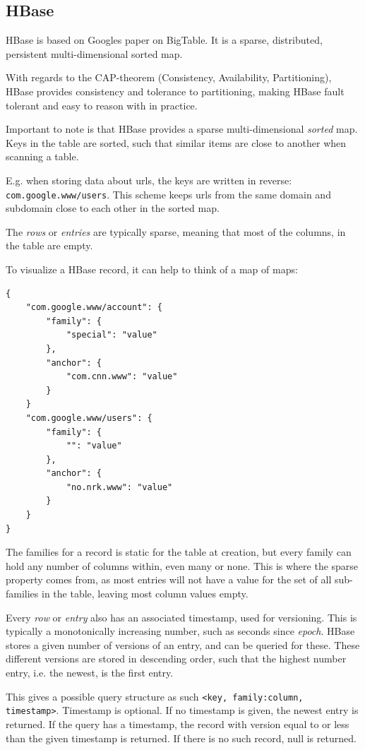 \subsection{HBase}
HBase is based on Googles paper on BigTable.
It is a sparse, distributed, persistent multi-dimensional sorted map.

With regards to the CAP-theorem (Consistency, Availability, Partitioning), HBase provides consistency and tolerance to partitioning, making HBase fault tolerant and easy to reason with in practice.

Important to note is that HBase provides a sparse multi-dimensional \emph{sorted} map.
Keys in the table are sorted, such that similar items are close to another when scanning a table.

E.g. when storing data about urls, the keys are written in reverse: \texttt{com.google.www/users}. This scheme keeps urls from the same domain and subdomain close to each other in the sorted map.

The \emph{rows} or \emph{entries} are typically sparse, meaning that most of the columns, in the table are empty.

To visualize a HBase record, it can help to think of a map of maps:

\begin{lstlisting}[style=customc, caption=A JSON approach to visualize how rows in HBase are structured. Idea courtesy of Jim R. Wilson\cite{jimbojw}.]
{
	"com.google.www/account": {
		"family": {
			"special": "value"
		},
		"anchor": {
			"com.cnn.www": "value"
		}
	}
	"com.google.www/users": {
		"family": {
			"": "value"
		},
		"anchor": {
			"no.nrk.www": "value"
		}
	}
}
\end{lstlisting}

The families for a record is static for the table at creation, but every family can hold any number of columns within, even many or none.
This is where the sparse property comes from, as most entries will not have a value for the set of all sub-families in the table, leaving most column values empty.

Every \emph{row} or \emph{entry} also has an associated timestamp, used for versioning. This is typically a monotonically increasing number, such as seconds since \emph{epoch}. HBase stores a given number of versions of an entry, and can be queried for these. 
These different versions are stored in descending order, such that the highest number entry, i.e. the newest, is the first entry.

This gives a possible query structure as such \texttt{<key, family:column, timestamp>}. Timestamp is optional. If no timestamp is given, the newest entry is returned. 
If the query has a timestamp, the record with version equal to or less than the given timestamp is returned. If there is no such record, null is returned.

